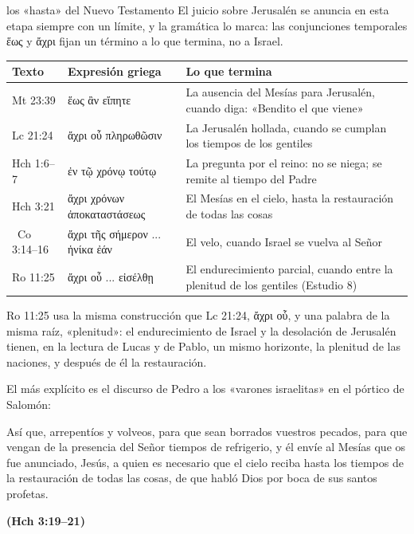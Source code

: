\documentclass[11pt,letterpaper]{article}
\newcommand{\grc}[1]{\foreignlanguage{ancientgreek}{#1}}
\newcommand{\fuente}[1]{\par\hfill{\upshape\bfseries\small\textcolor{ladrillo}{#1}}}
\begin{document}
\begin{perla}{los «hasta» del Nuevo Testamento}
El juicio sobre Jerusalén se anuncia en esta etapa siempre con un límite, y la gramática lo marca: las conjunciones temporales \grc{ἕως} y \grc{ἄχρι} fijan un término a lo que termina, no a Israel.\par\smallskip
{\centering\renewcommand{\arraystretch}{1.15}
\begin{tabular}{>{\RaggedRight\arraybackslash}p{2.1cm}>{\RaggedRight\arraybackslash}p{4.4cm}>{\RaggedRight\arraybackslash}p{7.3cm}}
\toprule
\textbf{Texto} & \textbf{Expresión griega} & \textbf{Lo que termina}\\
\midrule
Mt 23:39 & \grc{ἕως ἂν εἴπητε} & La ausencia del Mesías para Jerusalén, cuando diga: «Bendito el que viene»\\
Lc 21:24 & \grc{ἄχρι οὗ πληρωθῶσιν} & La Jerusalén hollada, cuando se cumplan los tiempos de los gentiles\\
Hch 1:6--7 & \grc{ἐν τῷ χρόνῳ τούτῳ} & La pregunta por el reino: no se niega; se remite al tiempo del Padre\\
Hch 3:21 & \grc{ἄχρι χρόνων ἀποκαταστάσεως} & El Mesías en el cielo, hasta la restauración de todas las cosas\\
2~Co 3:14--16 & \grc{ἄχρι τῆς σήμερον ... ἡνίκα ἐάν} & El velo, cuando Israel se vuelva al Señor\\
Ro 11:25 & \grc{ἄχρι οὗ ... εἰσέλθῃ} & El endurecimiento parcial, cuando entre la plenitud de los gentiles (Estudio 8)\\
\bottomrule
\end{tabular}\par}
\smallskip
Ro 11:25 usa la misma construcción que Lc 21:24, \grc{ἄχρι οὗ}, y una palabra de la misma raíz, «plenitud»: el endurecimiento de Israel y la desolación de Jerusalén tienen, en la lectura de Lucas y de Pablo, un mismo horizonte, la plenitud de las naciones, y después de él la restauración.
\end{perla}

El más explícito es el discurso de Pedro a los «varones israelitas» en el pórtico de Salomón:

\begin{cita}Así que, arrepentíos y volveos, para que sean borrados vuestros pecados, para que vengan de la presencia del Señor tiempos de refrigerio, y él envíe al Mesías que os fue anunciado, Jesús, a quien es necesario que el cielo reciba hasta los tiempos de la restauración de todas las cosas, de que habló Dios por boca de sus santos profetas.\fuente{(Hch 3:19--21)}\end{cita}
\end{document}
